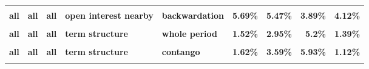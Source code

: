 \documentclass[
  authoryear,
  preprint,
  3p]{elsarticle}
\begin{document}
\begin{landscape}
\begin{longtable}[t]{>{}l>{}l>{}l>{}l>{}l>{}r>{}r>{}r>{}r}
\textbf{\cellcolor{gray!10}{all}} & \textbf{\cellcolor{gray!10}{all}} & \textbf{\cellcolor{gray!10}{all}} & \textbf{\cellcolor{gray!10}{open interest nearby}} & \textbf{\cellcolor{gray!10}{whole period}} & \textcolor[HTML]{4285f4}{\textbf{\cellcolor{gray!10}{5.98\%}}} & \textcolor[HTML]{4285f4}{\textbf{\cellcolor{gray!10}{5.63\%}}} & \textcolor[HTML]{4285f4}{\textbf{\cellcolor{gray!10}{4.09\%}}} & \textcolor[HTML]{4285f4}{\textbf{\cellcolor{gray!10}{4.32\%}}}\\
\textbf{all} & \textbf{all} & \textbf{all} & \textbf{open interest nearby} & \textbf{backwardation} & \textcolor[HTML]{4285f4}{\textbf{5.69\%}} & \textcolor[HTML]{4285f4}{\textbf{5.47\%}} & \textcolor[HTML]{4285f4}{\textbf{3.89\%}} & \textcolor[HTML]{4285f4}{\textbf{4.12\%}}\\
\textbf{\cellcolor{gray!10}{all}} & \textbf{\cellcolor{gray!10}{all}} & \textbf{\cellcolor{gray!10}{all}} & \textbf{\cellcolor{gray!10}{open interest nearby}} & \textbf{\cellcolor{gray!10}{contango}} & \textcolor[HTML]{4285f4}{\textbf{\cellcolor{gray!10}{6.41\%}}} & \textcolor[HTML]{4285f4}{\textbf{\cellcolor{gray!10}{6.21\%}}} & \textcolor[HTML]{4285f4}{\textbf{\cellcolor{gray!10}{4.73\%}}} & \textcolor[HTML]{4285f4}{\textbf{\cellcolor{gray!10}{4.74\%}}}\\
\textbf{all} & \textbf{all} & \textbf{all} & \textbf{term structure} & \textbf{whole period} & \textcolor[HTML]{4285f4}{\textbf{1.52\%}} & \textcolor[HTML]{4285f4}{\textbf{2.95\%}} & \textcolor[HTML]{4285f4}{\textbf{5.2\%}} & \textcolor[HTML]{4285f4}{\textbf{1.39\%}}\\
\addlinespace
\textbf{\cellcolor{gray!10}{all}} & \textbf{\cellcolor{gray!10}{all}} & \textbf{\cellcolor{gray!10}{all}} & \textbf{\cellcolor{gray!10}{term structure}} & \textbf{\cellcolor{gray!10}{backwardation}} & \textcolor[HTML]{4285f4}{\textbf{\cellcolor{gray!10}{1.87\%}}} & \textcolor[HTML]{4285f4}{\textbf{\cellcolor{gray!10}{2.7\%}}} & \textcolor[HTML]{4285f4}{\textbf{\cellcolor{gray!10}{4.56\%}}} & \textcolor[HTML]{4285f4}{\textbf{\cellcolor{gray!10}{2.3\%}}}\\
\textbf{all} & \textbf{all} & \textbf{all} & \textbf{term structure} & \textbf{contango} & \textcolor[HTML]{4285f4}{\textbf{1.62\%}} & \textcolor[HTML]{4285f4}{\textbf{3.59\%}} & \textcolor[HTML]{4285f4}{\textbf{5.93\%}} & \textcolor[HTML]{4285f4}{\textbf{1.12\%}}\\
\textbf{\cellcolor{gray!10}{US}} & \textbf{\cellcolor{gray!10}{all}} & \textbf{\cellcolor{gray!10}{all}} & \textbf{\cellcolor{gray!10}{market}} & \textbf{\cellcolor{gray!10}{whole period}} & \textcolor[HTML]{4285f4}{\textbf{\cellcolor{gray!10}{11.67\%}}} & \textcolor[HTML]{4285f4}{\textbf{\cellcolor{gray!10}{21.7\%}}} & \textcolor[HTML]{4285f4}{\textbf{\cellcolor{gray!10}{30.69\%}}} & \textcolor[HTML]{4285f4}{\textbf{\cellcolor{gray!10}{15.73\%}}}\\

\end{longtable}
\end{landscape}
\end{document}
